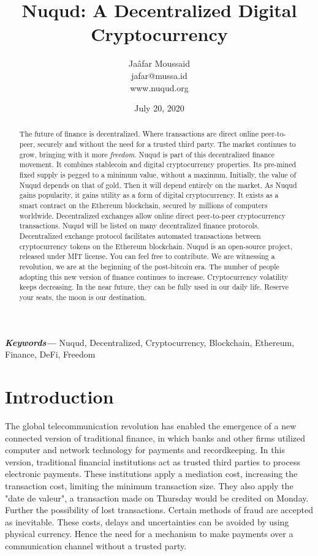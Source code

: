 \documentclass[12pt]{article}
\providecommand{\keywords}[1]
{
  \small    
  \textbf{\textit{Keywords---}} #1
}
\begin{document}
  \title{\Large Nuqud: A Decentralized Digital Cryptocurrency}
  \author{Jaâfar Moussaid\\ jafar@mussa.id\\ www.nuqud.org}
  \date{July 20, 2020}

  \maketitle
  \thispagestyle{empty}

\begin{abstract}
The future of finance is decentralized. Where transactions are direct online peer-to-peer, securely and without the need for a trusted third party. The market continues to grow, bringing with it more \emph{freedom}. Nuqud is part of this decentralized finance movement. It combines stablecoin and digital cryptocurrency properties. Its pre-mined fixed supply is pegged to a minimum value, without a maximum. Initially, the value of Nuqud depends on that of gold. Then it will depend entirely on the market. As Nuqud gains popularity, it gains utility as a form of digital cryptocurrency. It exists as a smart contract on the Ethereum blockchain, secured by millions of computers worldwide. Decentralized exchanges allow online direct peer-to-peer cryptocurrency transactions. Nuqud will be listed on many decentralized finance protocols. Decentralized exchange protocol facilitates automated transactions between cryptocurrency tokens on the Ethereum blockchain. Nuqud is an open-source project, released under MIT license. You can feel free to contribute. We are witnessing a revolution, we are at the beginning of the post-bitcoin era. The number of people adopting this new version of finance continues to increase. Cryptocurrency volatility keeps decreasing. In the near future, they can be fully used in our daily life. Reserve your seats, the moon is our destination.
\end{abstract}
\keywords{Nuqud, Decentralized, Cryptocurrency, Blockchain, Ethereum, Finance, DeFi, Freedom}

\section{Introduction}\label{sec:int}

The global telecommunication revolution has enabled the emergence of a new connected version of traditional finance, in which banks and other firms utilized computer and network technology for payments and recordkeeping. In this version, traditional financial institutions act as trusted third parties to process electronic payments. These institutions apply a mediation cost, increasing the transaction cost, limiting the minimum transaction size. They also apply the "date de valeur", a transaction made on Thursday would be credited on Monday. Further the possibility of lost transactions. Certain methods of fraud are accepted as inevitable. These costs, delays and uncertainties can be avoided by using physical currency. Hence the need for a mechanism to make payments over a communication channel without a trusted party.
\end{document}
